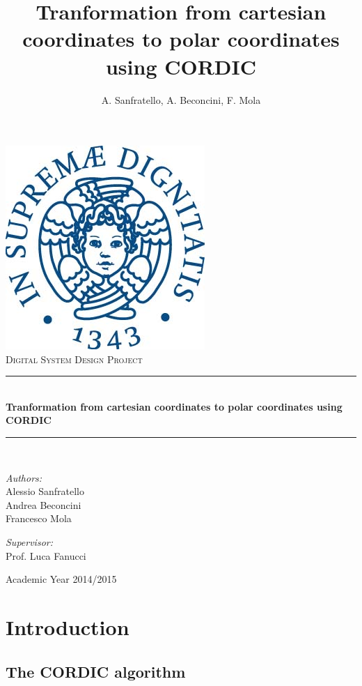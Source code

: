 \documentclass[12pt,a4paper,openright]{report}
\author{A. Sanfratello, A. Beconcini, F. Mola}
\title{Tranformation from cartesian coordinates to polar coordinates using CORDIC}
\newcommand{\HRule}{\rule{\linewidth}{0.5mm}}
\begin{document}
\begin{titlepage}
\begin{center}
	\includegraphics[scale=.60]{Unipi_logo.jpg}\\[3cm]
	\textsc{\Large Digital System Design Project}
	\HRule \\[0.4cm]
{ \huge \bfseries Tranformation from cartesian coordinates to polar coordinates using CORDIC \\[0.4cm] }
	\HRule \\[4cm]
	\noindent
	\begin{minipage}{0.4\textwidth}
	\begin{flushleft} \large
	\emph{Authors:}\\
	Alessio Sanfratello\\
	Andrea Beconcini\\
	Francesco Mola 
	\end{flushleft}
	\end{minipage}%
	\begin{minipage}{0.4\textwidth}
	\begin{flushright} \large
	\emph{Supervisor:} \\
	Prof. Luca Fanucci
	\end{flushright}
	\end{minipage}

	\vfill
	{\large Academic Year 2014/2015}
\end{center}
\end{titlepage}

\tableofcontents

\chapter{Introduction}

\section{The CORDIC algorithm}
\end{document}
